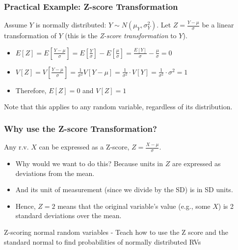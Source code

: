 \documentclass[handout]{beamer} %
\begin{document}
\begin{frame} %
\frametitle{Practical Example: Z-score Transformation}

Assume $Y$ is normally distributed: $Y \sim N(\mu_Y, \sigma_Y^2)$. Let $Z = \frac{Y - \mu}{\sigma}$ be a linear transformation of $Y$ (this is the \emph{Z-score transformation} to $Y$).
\pause

\begin{itemize}
    \item $E[Z] = E[\frac{Y - \mu}{\sigma}] = E[\frac{Y}{\sigma} ] - E[\frac{\mu}{\sigma}] =  \frac{E[Y]}{\sigma} - \frac{\mu}{\sigma} =   0$
\pause
    \item $V[Z] = V[\frac{Y - \mu}{\sigma}] = \frac{1}{\sigma^2}  V[Y - \mu]   = \frac{1}{\sigma^2} \cdot V[Y] = \frac{1}{\sigma^2} \cdot  \sigma^2 =  1$
\pause
    \item Therefore, $E[Z] = 0$ and $V[Z] = 1$
\pause
\end{itemize}
Note that this applies to any random variable, regardless of its distribution. 
\end{frame}

\begin{frame} %
\frametitle{Why use the Z-score Transformation?}

Any r.v. $X$ can be expressed as a Z-score, $Z = \frac{X - \mu}{\sigma}$. 

\begin{itemize}
    \item Why would we want to do this? Because units in $Z$ are expressed as deviations from the mean. 
    \item And its unit of measurement (since we divide by the SD) is in SD units. 
    \item Hence, $Z=2$ means that the original variable's value (e.g., some $X$) is 2 standard deviations over the mean.
\end{itemize}
\end{frame}

\begin{frame}{Z-scoring normal random variables}
    - Teach how to use the Z score and the standard normal to find probabilities of normally distributed RVs
\end{frame}
\end{document}
